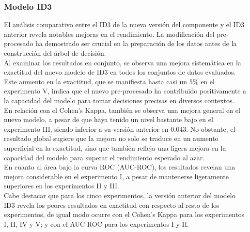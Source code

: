 \subsubsection*{Modelo ID3}
El análisis comparativo entre el ID3 de la nueva versión del componente y el ID3 anterior revela notables mejoras en el rendimiento. La modificación del pre-procesado ha demostrado ser crucial en la preparación de los datos antes de la construcción del árbol de decisión. \\
Al examinar los resultados en conjunto, se observa una mejora sistemática en la exactitud del nuevo modelo de ID3 en todos los conjuntos de datos evaluados. Este aumento en la exactitud, que se manifiesta hasta casi un 5\% en el experimento V, indica que el nuevo pre-procesado ha contribuido positivamente a la capacidad del modelo para tomar decisiones precisas en diversos contextos. \\
En relación con el Cohen's Kappa, también se observa una mejora general en el nuevo modelo, a pesar de que haya tenido un nivel bastante bajo en el experimento III, siendo inferior a su versión anterior en 0.043. No obstante, el resultado global sugiere que la mejora no solo se traduce en un aumento superficial en la exactitud, sino que también refleja una ligera mejora en la capacidad del modelo para superar el rendimiento esperado al azar. \\
En cuanto al área bajo la curva ROC (AUC-ROC), los resultados revelan una mejora considerable en el experimento I, a pesar de mantenerse ligeramente superiores en los experimentos II y III. \\
Cabe destacar que para los cinco experimentos, la versión anterior del modelo ID3 revela los peores resultados en exactitud con respecto al resto de los experimentos, de igual modo ocurre con el Cohen's Kappa para los experimentos I, II, IV y V; y con el AUC-ROC para los experimentos I y II.

